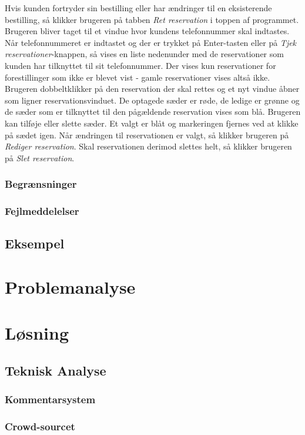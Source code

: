 \documentclass[final]{rapport1}
\begin{document}
Hvis kunden fortryder sin bestilling eller har ændringer til en eksisterende bestilling, så klikker brugeren på tabben \emph{Ret reservation} i toppen af programmet. Brugeren bliver taget til et vindue hvor kundens telefonnummer skal indtastes. Når telefonnummeret er indtastet og der er trykket på Enter-tasten eller på \emph{Tjek reservationer}-knappen, så vises en liste nedenunder med de reservationer som kunden har tilknyttet til sit telefonnummer. Der vises kun reservationer for forestillinger som ikke er blevet vist - gamle reservationer vises altså ikke. Brugeren dobbeltklikker på den reservation der skal rettes og et nyt vindue åbner som ligner reservationsvinduet. De optagede sæder er røde, de ledige er grønne og de sæder som er tilknyttet til den pågældende reservation vises som blå. Brugeren kan tilføje eller slette sæder. Et valgt er blåt og markeringen fjernes ved at klikke på sædet igen. Når ændringen til reservationen er valgt, så klikker brugeren på \emph{Rediger reservation}. Skal reservationen derimod slettes helt, så klikker brugeren på \emph{Slet reservation}.

\subsection{Begrænsninger}
\subsection{Fejlmeddelelser}
\section{Eksempel}

\clearpage
\chapter{Problemanalyse}

\chapter{Løsning}
\section{Teknisk Analyse}
\subsection{Kommentarsystem}


\subsection{Crowd-sourcet}
\end{document}
